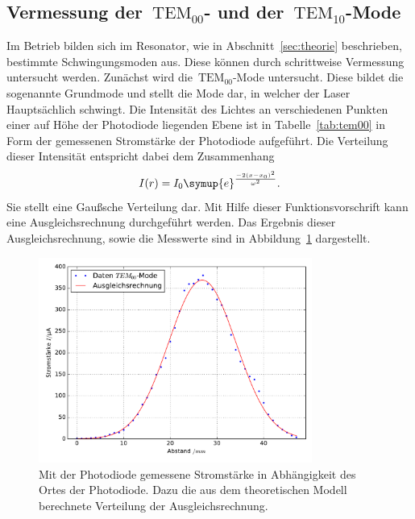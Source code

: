 \subsection{Vermessung der~$\text{TEM}_{00}$- und der~$\text{TEM}_{10}$-Mode}
%
Im Betrieb bilden sich im Resonator, wie in Abschnitt~\ref{sec:theorie} beschrieben, bestimmte Schwingungsmoden aus. Diese können durch
schrittweise Vermessung untersucht werden. Zunächst wird die~$\text{TEM}_{00}$-Mode untersucht. Diese bildet die sogenannte Grundmode und stellt die
Mode dar, in welcher der Laser Hauptsächlich schwingt. Die Intensität des Lichtes an verschiedenen Punkten einer auf Höhe der Photodiode liegenden
Ebene ist in Tabelle~\ref{tab:tem00} in Form der gemessenen Stromstärke der Photodiode aufgeführt. Die Verteilung dieser Intensität entspricht dabei
dem Zusammenhang
%
\begin{equation}
  I(r)=I_0\symup{e}^{\frac{-2(x-x_0)^2}{\omega^2}}.
\end{equation}
%
Sie stellt eine Gaußsche Verteilung dar. Mit Hilfe dieser Funktionsvorschrift kann eine Ausgleichsrechnung durchgeführt werden. Das Ergebnis dieser Ausgleichsrechnung, sowie die Messwerte sind in Abbildung~\ref{fig:tem00} dargestellt.
%
\begin{figure}[h]
  \centering
  \includegraphics[width=0.8\textwidth]{auswertung/plot_Mode00.pdf}
  \caption{Mit der Photodiode gemessene Stromstärke in Abhängigkeit des Ortes der Photodiode. Dazu die aus dem theoretischen Modell berechnete Verteilung der Ausgleichsrechnung.}
  \label{fig:tem00}
\end{figure}
%
